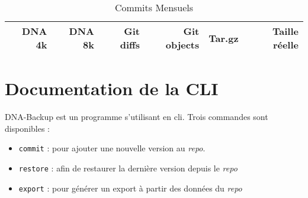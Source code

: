 \documentclass[a4paper]{report}
\newcommand{\fonts}[2][m]{{\fontseries{#1}\selectfont #2}} %
\newcommand{\textb}{\fonts[b]}
\begin{document}
\begin{table*}[ht]
\centering
\begin{tabularx}{\textwidth}{@{}RRRRRR}
\textb{DNA 4k} &
\textb{DNA 8k} &
\textb{Git diffs} &
\textb{Git objects} &
\textb{Tar.gz} &
\textb{Taille réelle} \\
\hline

\end{tabularx}
\caption{Commits Mensuels}
\label{tab:commits-monthly}
\end{table*}




\appendix



\chapter{Documentation de la CLI}

DNA-Backup est un programme s'utilisant en \ac{cli}.
Trois commandes sont disponibles :

\begin{itemize}
  \item \verb|commit| : pour ajouter une nouvelle version au \emph{repo}.
  \item \verb|restore| : afin de restaurer la dernière version depuis le \emph{repo}
  \item \verb|export| : pour générer un export à partir des données du \emph{repo}
\end{itemize}
\end{document}
